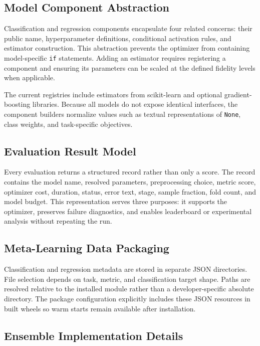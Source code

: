 \documentclass[12pt,a4paper,oneside]{report}
\begin{document}
\subsection{Model Component Abstraction}

Classification and regression components encapsulate four related concerns:
their public name, hyperparameter definitions, conditional activation rules,
and estimator construction. This abstraction prevents the optimizer from
containing model-specific \texttt{if} statements. Adding an estimator requires
registering a component and ensuring its parameters can be scaled at the
defined fidelity levels when applicable.

\medskip

\noindent The current registries include estimators from scikit-learn and optional
gradient-boosting libraries. Because all models do not expose identical
interfaces, the component builders normalize values such as textual
representations of \texttt{None}, class weights, and task-specific objectives.

\subsection{Evaluation Result Model}

Every evaluation returns a structured record rather than only a score. The
record contains the model name, resolved parameters, preprocessing choice,
metric score, optimizer cost, duration, status, error text, stage, sample
fraction, fold count, and model budget. This representation serves three
purposes: it supports the optimizer, preserves failure diagnostics, and enables
leaderboard or experimental analysis without repeating the run.

\subsection{Meta-Learning Data Packaging}

Classification and regression metadata are stored in separate JSON
directories. File selection depends on task, metric, and classification target
shape. Paths are resolved relative to the installed module rather than a
developer-specific absolute directory. The package configuration explicitly
includes these JSON resources in built wheels so warm starts remain available
after installation.

\subsection{Ensemble Implementation Details}
\end{document}
